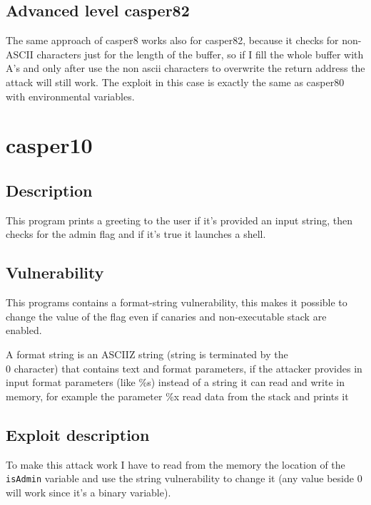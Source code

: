 \documentclass[a4paper,12pt]{article}
\begin{document}
\subsection{Advanced level casper82}

The same approach of casper8 works also for casper82, because it checks for non-ASCII characters just for the length of the buffer, so if I fill the whole buffer with A's and only after use the non ascii characters to overwrite the return address the attack will still work. The exploit in this case is exactly the same as casper80 with environmental variables.



\section{casper10}

\subsection{Description}
This program prints a greeting to the user if it's provided an input string, then checks for the admin flag and if it's true it launches a shell. 



\subsection{Vulnerability}

This programs contains a format-string vulnerability, this makes it possible to change the value of the flag even if canaries and non-executable stack are enabled.

A format string is an ASCIIZ string (string is terminated by the \\0 character) that contains text and format parameters, if the attacker provides in input format parameters (like \%s) instead of a string it can read and write in memory, for example the parameter \%x read data from the stack and prints it %

\subsection{Exploit description}

To make this attack work I have to read from the memory the location of the \texttt{isAdmin} variable and use the string vulnerability to change it (any value beside 0 will work since it's a binary variable). 
\end{document}
